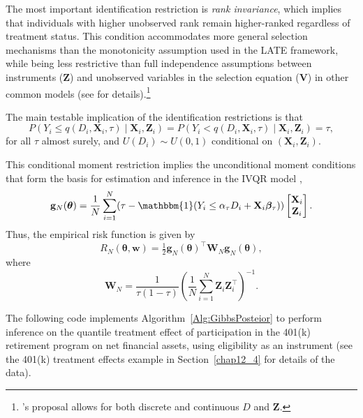 The most important identification restriction is \textit{rank invariance}, which implies that individuals with higher unobserved rank remain higher-ranked regardless of treatment status. This condition accommodates more general selection mechanisms than the monotonicity assumption used in the LATE framework, while being less restrictive than full independence assumptions between instruments ($\mathbf{Z}$) and unobserved variables in the selection equation ($\mathbf{V}$) in other common models (see \cite{chernozhukov2004effects,Chernozhukov2005} for details).\footnote{\cite{Chernozhukov2005}'s proposal allows for both discrete and continuous $D$ and $\mathbf{Z}$.} 

The main testable implication of the identification restrictions is that
\[
P\!\left(Y_i \leq q(D_i,\mathbf{X}_i,\tau)\mid \mathbf{X}_i,\mathbf{Z}_i\right)
= P\!\left(Y_i < q(D_i,\mathbf{X}_i,\tau)\mid \mathbf{X}_i,\mathbf{Z}_i\right)
= \tau,
\]
for all $\tau$ almost surely, and $U(D_i)\sim U(0,1)$ conditional on $(\mathbf{X}_i,\mathbf{Z}_i)$.  

This conditional moment restriction implies the unconditional moment conditions that form the basis for estimation and inference in the IVQR model \cite{chernozhukov2003mcmc,chernozhukov2004effects},
\[
\mathbf{g}_N(\boldsymbol{\theta})=\frac{1}{N}\sum_{i=1}^N (\tau-\mathbbm{1}(Y_i\leq \alpha_{\tau}D_i+\mathbf{X}_i\boldsymbol{\beta}_{\tau}))\begin{bmatrix}
\mathbf{X}_i\\
\mathbf{Z}_i
\end{bmatrix}.
\]
Thus, the empirical risk function is given by 
\[
R_N(\boldsymbol{\theta},\mathbf{w})=\tfrac{1}{2}\mathbf{g}_N(\boldsymbol{\theta})^{\top}\mathbf{W}_N\mathbf{g}_N(\boldsymbol{\theta}),
\]
where
\[
\mathbf{W}_N=\frac{1}{\tau(1-\tau)}\left(\frac{1}{N}\sum_{i=1}^N \mathbf{Z}_i\mathbf{Z}_i^{\top}\right)^{-1}.
\]

The following code implements Algorithm~\ref{Alg:GibbsPosteior} to perform inference on the quantile treatment effect of participation in the 401(k) retirement program on net financial assets, using eligibility as an instrument (see the 401(k) treatment effects example in Section~\ref{chap12_4} for details of the data).


